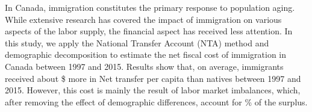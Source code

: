 In Canada, immigration constitutes the primary response to population aging. While extensive research has covered the impact of immigration on various aspects of the labor supply, the financial aspect has received less attention.
In this study, we apply the National Transfer Account (NTA) method and demographic decomposition to estimate the net fiscal cost of immigration in Canada between 1997 and 2015.
Results show that, on average, immigrants received about \$ more in Net transfer per capita than natives between 1997 and 2015.
However, this cost is mainly the result of labor market imbalances, which, after removing the effect of demographic differences, account for \% of the surplus.